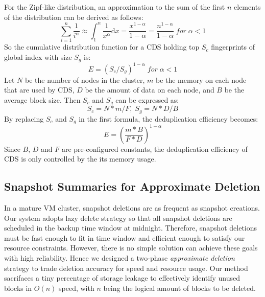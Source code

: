 For the Zipf-like distribution, an approximation to the sum of the first $n$ 
elements of the distribution can be derived as follows:
\begin{equation}
\sum_{i=1}^{n}\frac{1}{i^\alpha}\approx \int_{1}^{n}\frac{1}{x^\alpha}\mathrm{d}x=\frac{x^{1-\alpha}}{1-\alpha}=\frac{n^{1-\alpha}}{1-\alpha}\;  for\;  \alpha<1
\end{equation}
So the cumulative distribution function for a CDS holding top $S_c$ fingerprints
of global index with size $S_g$ is:
\begin{equation}
  E = (S_c / S_g)^{1-\alpha} \;  for\;  \alpha<1
\end{equation}
Let $N$ be the number of nodes in the cluster, $m$ be the memory on each node that are used by CDS, $D$ be the amount of data on each node, and $B$ be the average block size. Then $S_c$ and $S_g$ can be expressed as:
\begin{equation}
S_c = N*m/F, \; S_g = N*D/B
\end{equation}
By replacing $S_c$ and $S_g$ in the first formula, the deduplication efficiency becomes:
\begin{equation}
  E = (\frac{m*B}{F*D})^{1-\alpha}
\end{equation}
Since $B$, $D$ and $F$ are pre-configured constants, the deduplication efficiency of CDS is only controlled by the its memory usage.

\subsection{Snapshot Summaries for Approximate Deletion}
In a mature VM cluster, snapshot deletions are as frequent as snapshot creations.
Our system adopts lazy delete strategy so that all snapshot deletions are scheduled
in the backup time window at midnight. 
Therefore, snapshot deletions must be fast enough to fit in time window and
efficient enough to satisfy our resource constraints.
However, there is no simple solution can achieve these goals with high reliability.
Hence we designed a two-phase {\em approximate deletion} strategy to trade deletion accuracy for
speed and resource usage. Our method sacrifaces a tiny percentage of storage leakage
to effectively identify unused blocks in $O(n)$ speed, with $n$ being the logical amount of blocks 
to be deleted.

